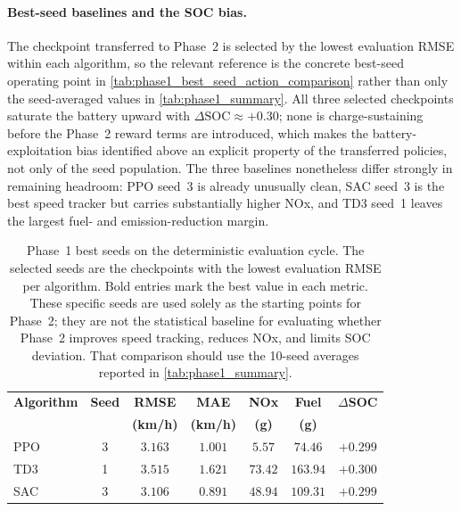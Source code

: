 \paragraph{Best-seed baselines and the \ac{SOC} bias.}
The checkpoint transferred to Phase~2 is selected by the lowest evaluation \ac{RMSE} within each algorithm, so the relevant reference is the concrete best-seed operating point in \autoref{tab:phase1_best_seed_action_comparison} rather than only the seed-averaged values in \autoref{tab:phase1_summary}. All three selected checkpoints saturate the battery upward with $\Delta\text{SOC}\approx+0.30$; none is charge-sustaining before the Phase~2 reward terms are introduced, which makes the battery-exploitation bias identified above an explicit property of the transferred policies, not only of the seed population. The three baselines nonetheless differ strongly in remaining headroom: PPO seed~3 is already unusually clean, SAC seed~3 is the best speed tracker but carries substantially higher \ac{NOx}, and TD3 seed~1 leaves the largest fuel- and emission-reduction margin.

\begin{table}[H]
  \centering
  \small
  \begin{tabular}{lcccccc}
    \hline
    \textbf{Algorithm} & \textbf{Seed} & \textbf{RMSE} & \textbf{MAE} & \textbf{\ac{NOx}} & \textbf{Fuel} & \textbf{$\Delta$\ac{SOC}} \\
    & & \textbf{(km/h)} & \textbf{(km/h)} & \textbf{(g)} & \textbf{(g)} & \\
    \hline
    PPO & 3 & $3.163$ & $1.001$ & $\mathbf{5.57}$ & $\mathbf{74.46}$ & $+0.299$ \\
    TD3 & 1 & $3.515$ & $1.621$ & $73.42$ & $163.94$ & $+0.300$ \\
    SAC & 3 & $\mathbf{3.106}$ & $\mathbf{0.891}$ & $48.94$ & $109.31$ & $+0.299$ \\
    \hline
  \end{tabular}
  \caption[Phase~1 best-seed comparison]{Phase~1 best seeds on the deterministic evaluation cycle. The selected seeds are the checkpoints with the lowest evaluation \ac{RMSE} per algorithm. Bold entries mark the best value in each metric. These specific seeds are used solely as the starting points for Phase~2; they are not the statistical baseline for evaluating whether Phase~2 improves speed tracking, reduces \ac{NOx}, and limits \ac{SOC} deviation. That comparison should use the 10-seed averages reported in \autoref{tab:phase1_summary}.}
  \label{tab:phase1_best_seed_action_comparison}
\end{table}


